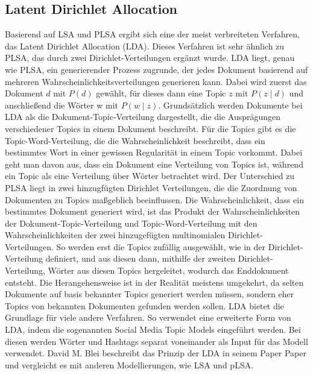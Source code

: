 \documentclass[german,version-2020-11]{uzl-thesis}
\begin{document}
\subsection{Latent Dirichlet Allocation}
Basierend auf LSA und PLSA ergibt sich eine der meist verbreiteten Verfahren, das Latent Dirichlet Allocation (LDA). Dieses Verfahren ist sehr ähnlich zu PLSA, das durch zwei Dirichlet-Verteilungen ergänzt wurde. LDA liegt, genau wie PLSA, ein generierender Prozess zugrunde, der jedes Dokument basierend auf mehreren Wahrscheinlichkeitsverteilungen generieren kann. Dabei wird zuerst das Dokument $d$ mit $P(d)$ gewählt, für dieses dann eine Topic $z$ mit $P(z \mid d)$ und anschließend die Wörter w mit $P(w \mid z)$. Grundsätzlich werden Dokumente bei LDA als die Dokument-Topic-Verteilung dargestellt, die die Ausprägungen verschiedener Topics in einem Dokument beschreibt. Für die Topics gibt es die Topic-Word-Verteilung, die die Wahrscheinlichkeit beschreibt, dass ein bestimmtes Wort in einer gewissen Regularität in einem Topic vorkommt. Dabei geht man davon aus, dass ein Dokument eine Verteilung von Topics ist, während ein Topic als eine Verteilung über Wörter betrachtet wird. Der Unterschied zu PLSA liegt in zwei hinzugfügten Dirichlet Verteilungen, die die Zuordnung von Dokumenten zu Topics maßgeblich beeinflussen.
Die Wahrscheinlichkeit, dass ein bestimmtes Dokument generiert wird, ist das Produkt der Wahrscheinlichkeiten der Dokument-Topic-Verteilung und Topic-Word-Verteilung mit den Wahrscheinlichkeiten der zwei hinzugefügten multinomialen Dirichlet-Verteilungen. So werden erst die Topics zufällig ausgewählt, wie in der Dirichlet-Verteilung definiert, und aus diesen dann, mithilfe der zweiten Dirichlet-Verteilung, Wörter aus diesen Topics hergeleitet, wodurch das Enddokument entsteht. Die Herangehensweise ist in der Realität meistens umgekehrt, da selten Dokumente auf basis bekannter Topics generiert werden müssen, sondern eher Topics von bekannten Dokumenten gefunden werden sollen. LDA bietet die Grundlage für viele andere Verfahren. So verwendet \cite{t0} eine erweiterte Form von LDA, indem die sogenannten Social Media Topic Models eingeführt werden. Bei diesen werden Wörter und Hashtags separat voneinander als Input für das Modell verwendet. David M. Blei beschreibt das Prinzip der LDA in seinem Paper Paper \cite{lda} und vergleicht es mit anderen Modellierungen, wie LSA und pLSA. 
\end{document}
